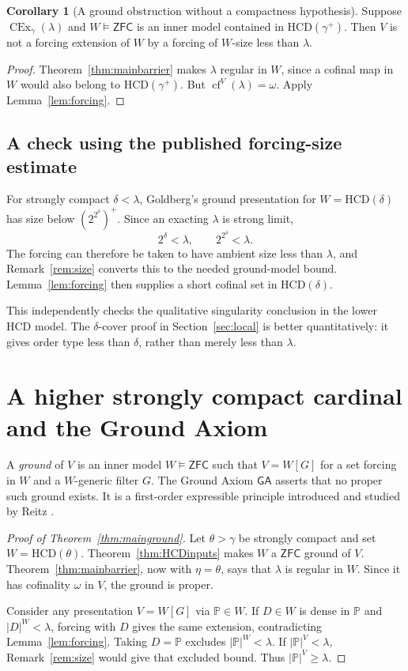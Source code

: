 \documentclass[11pt,letterpaper]{article}
\theoremstyle{definition}
\newtheorem{corollary}[definition]{Corollary}
\newcommand{\ZFC}{\mathsf{ZFC}}
\newcommand{\CEx}{\operatorname{CEx}}
\newcommand{\cf}{\operatorname{cf}}
\newcommand{\HCD}{\mathrm{HCD}}
\newcommand{\GA}{\mathsf{GA}}
\numberwithin{equation}{section}
\begin{document}
\begin{corollary}[A ground obstruction without a compactness hypothesis]\label{cor:ground-general}
Suppose $\CEx_\gamma(\lambda)$ and $W\models\ZFC$ is an inner model contained in $\HCD(\gamma^+)$. Then $V$ is not a forcing extension of $W$ by a forcing of $W$-size less than $\lambda$.
\end{corollary}

\begin{proof}
Theorem~\ref{thm:mainbarrier} makes $\lambda$ regular in $W$, since a cofinal map in $W$ would also belong to $\HCD(\gamma^+)$. But $\cf^V(\lambda)=\omega$. Apply Lemma~\ref{lem:forcing}.
\end{proof}

\subsection{A check using the published forcing-size estimate}

For strongly compact $\delta<\lambda$, Goldberg's ground presentation for $W=\HCD(\delta)$ has size below $(2^{2^\delta})^+$. Since an exacting $\lambda$ is strong limit,
\[
 2^\delta<\lambda,\qquad 2^{2^\delta}<\lambda.
\]
The forcing can therefore be taken to have ambient size less than $\lambda$, and Remark~\ref{rem:size} converts this to the needed ground-model bound. Lemma~\ref{lem:forcing} then supplies a short cofinal set in $\HCD(\delta)$.

This independently checks the qualitative singularity conclusion in the lower HCD model. The $\delta$-cover proof in Section~\ref{sec:local} is better quantitatively: it gives order type less than $\delta$, rather than merely less than $\lambda$.

\section{A higher strongly compact cardinal and the Ground Axiom}\label{sec:grounds}

A \emph{ground} of $V$ is an inner model $W\models\ZFC$ such that $V=W[G]$ for a set forcing in $W$ and a $W$-generic filter $G$. The Ground Axiom $\GA$ asserts that no proper such ground exists. It is a first-order expressible principle introduced and studied by Reitz \cite{reitz}.

\begin{proof}[Proof of Theorem~\ref{thm:mainground}]
Let $\theta>\gamma$ be strongly compact and set $W=\HCD(\theta)$. Theorem~\ref{thm:HCDinputs} makes $W$ a $\ZFC$ ground of $V$. Theorem~\ref{thm:mainbarrier}, now with $\eta=\theta$, says that $\lambda$ is regular in $W$. Since it has cofinality $\omega$ in $V$, the ground is proper.

Consider any presentation $V=W[G]$ via $\mathbb P\in W$. If $D\in W$ is dense in $\mathbb P$ and $|D|^W<\lambda$, forcing with $D$ gives the same extension, contradicting Lemma~\ref{lem:forcing}. Taking $D=\mathbb P$ excludes $|\mathbb P|^W<\lambda$. If $|\mathbb P|^V<\lambda$, Remark~\ref{rem:size} would give that excluded bound. Thus $|\mathbb P|^V\geq\lambda$.
\end{proof}
\end{document}
